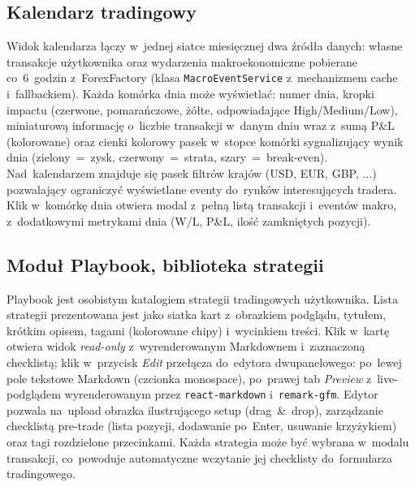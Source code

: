 \documentclass[12pt,a4paper]{article}
\begin{document}
\subsection*{Kalendarz tradingowy}
Widok kalendarza łączy w~jednej siatce miesięcznej dwa źródła danych: własne transakcje użytkownika oraz wydarzenia makroekonomiczne pobierane co~6~godzin z~ForexFactory (klasa \texttt{MacroEventService} z~mechanizmem cache i~fallbackiem). Każda komórka dnia może wyświetlać: numer dnia, kropki impactu (czerwone, pomarańczowe, żółte, odpowiadające High/Medium/Low), miniaturową informację o~liczbie transakcji w~danym dniu wraz z~sumą P\&L (kolorowane) oraz cienki kolorowy pasek w~stopce komórki sygnalizujący wynik dnia (zielony~=~zysk, czerwony~=~strata, szary~=~break-even). Nad~kalendarzem znajduje się pasek filtrów krajów (USD, EUR, GBP, ...) pozwalający ograniczyć wyświetlane eventy do~rynków interesujących tradera. Klik w~komórkę dnia otwiera modal z~pełną listą transakcji i~eventów makro, z~dodatkowymi metrykami dnia (W/L, P\&L, ilość zamkniętych pozycji).

\subsection*{Moduł Playbook, biblioteka strategii}
Playbook jest osobistym katalogiem strategii tradingowych użytkownika. Lista strategii prezentowana jest jako siatka kart z~obrazkiem podglądu, tytułem, krótkim opisem, tagami (kolorowane chipy) i~wycinkiem treści. Klik w~kartę otwiera widok \emph{read-only} z~wyrenderowanym Markdownem i~zaznaczoną checklistą; klik w~przycisk \emph{Edit} przełącza do~edytora dwupanelowego: po~lewej pole tekstowe Markdown (czcionka monospace), po~prawej tab \emph{Preview} z~live-podglądem wyrenderowanym przez \texttt{react-markdown} i~\texttt{remark-gfm}. Edytor pozwala na~upload obrazka ilustrującego setup (drag~\&~drop), zarządzanie checklistą pre-trade (lista pozycji, dodawanie po~Enter, usuwanie krzyżykiem) oraz tagi rozdzielone przecinkami. Każda strategia może być wybrana w~modalu transakcji, co~powoduje automatyczne wczytanie jej checklisty do~formularza tradingowego.
\end{document}
